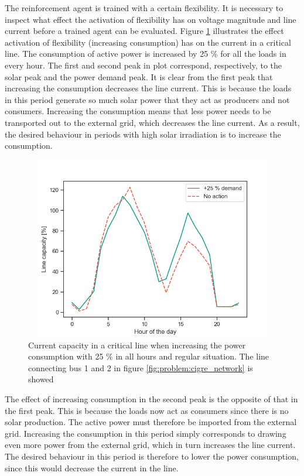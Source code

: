 \documentclass[class=book, crop=false]{standalone}
\begin{document}
The reinforcement agent is trained with a certain flexibility. It is necessary to inspect what effect the activation of flexibility has on voltage magnitude and line current before a trained agent can be evaluated. Figure \ref{fig:results:increase_demand_current} illustrates the effect activation of flexibility (increasing consumption) has on the current in a critical line. The consumption of active power is increased by 25 \% for all the loads in every hour. The first and second peak in plot correspond, respectively, to the solar peak and the power demand peak. It is clear from the first peak that increasing the consumption decreases the line current. This is because the loads in this period generate so much solar power that they act as producers and not consumers. Increasing the consumption means that less power needs to be transported out to the external grid, which decreases the line current. As a result, the desired behaviour in periods with high solar irradiation is to increase the consumption.


\begin{figure}[h]
    \center
\includegraphics[height=8cm, width=12cm]{figures/increase_demand_current.png}
    \caption[size = 9]{Current capacity in a critical line when increasing the power consumption with 25 \% in all hours and regular situation. The line connecting bus 1 and 2 in figure \ref{fig:problem:cigre_network} is showed}
    \label{fig:results:increase_demand_current}
\end{figure}

The effect of increasing consumption in the second peak is the opposite of that in the first peak. This is because the loads now act as consumers since there is no solar production. The active power must therefore be imported from the external grid. Increasing the consumption in this period simply corresponds to drawing even more power from the external grid, which in turn increases the line current. The desired behaviour in this period is therefore to lower the power consumption, since this would decrease the current in the line. 
\end{document}
